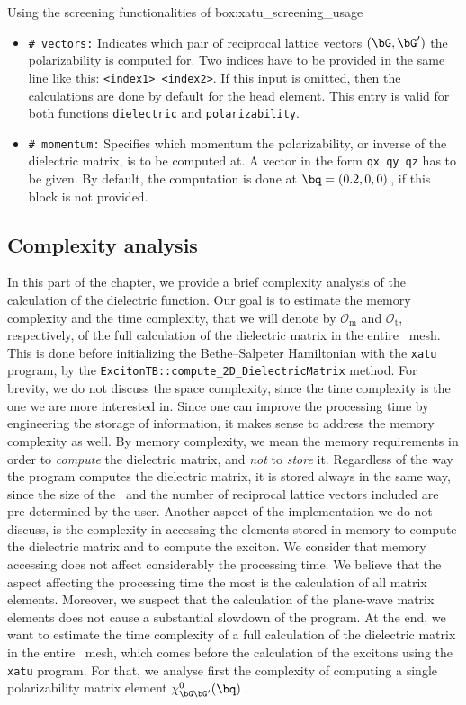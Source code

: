 \begin{mybox}{Using the screening functionalities of \xatu}{box:xatu_screening_usage}
\begin{itemize}
        \item \texttt{\# vectors:} Indicates which pair of reciprocal lattice vectors $(\bG,\bG')$ the polarizability is computed for.
        Two indices have to be provided in the same line like this: \texttt{<index1> <index2>}.
        If this input is omitted, then the calculations are done by default for the head element.
        This entry is valid for both functions \texttt{dielectric} and \texttt{polarizability}.
        \item \texttt{\# momentum:} Specifies which momentum the polarizability, or inverse of the dielectric matrix, is to be computed at.
        A vector in the form \texttt{qx qy qz} has to be given.
        By default, the computation is done at $\bq=(0.2,0,0)$\,, if this block is not provided.
    \end{itemize}
\end{mybox}

\clearpage

\subsection{Complexity analysis}
\label{subsec:complexity_analysis}

In this part of the chapter, we provide a brief complexity analysis of the calculation of the dielectric function.
Our goal is to estimate the memory complexity and the time complexity, that we will denote by $\mathcal{O}_{\mathrm{m}}$ and $\mathcal{O}_{\mathrm{t}}$, respectively, of the full calculation of the dielectric matrix in the entire \bz~mesh.
This is done before initializing the Bethe--Salpeter Hamiltonian with the \texttt{xatu} program, by the \texttt{ExcitonTB::compute\_2D\_DielectricMatrix} method.
For brevity, we do not discuss the space complexity, since the time complexity is the one we are more interested in.
Since one can improve the processing time by engineering the storage of information, it makes sense to address the memory complexity as well.
By memory complexity, we mean the memory requirements in order to \textit{compute} the dielectric matrix, and \textit{not} to \textit{store} it.
Regardless of the way the program computes the dielectric matrix, it is stored always in the same way, since the size of the \bz~and the number of reciprocal lattice vectors included are pre-determined by the user.
Another aspect of the implementation we do not discuss, is the complexity in accessing the elements stored in memory to compute the dielectric matrix and to compute the exciton.
We consider that memory accessing does not affect considerably the processing time.
We believe that the aspect affecting the processing time the most is the calculation of all matrix elements.
Moreover, we suspect that the calculation of the plane-wave matrix elements does not cause a substantial slowdown of the program.
At the end, we want to estimate the time complexity of a full calculation of the dielectric matrix in the entire \bz~mesh, which comes before the calculation of the excitons using the \texttt{xatu} program.
For that, we analyse first the complexity of computing a single polarizability matrix element $\chi^0_{\bG \bG'}(\bq)$\,.

